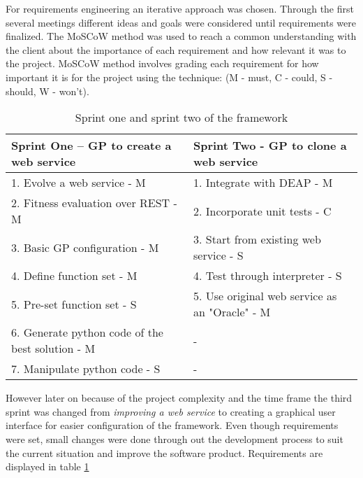 For requirements engineering an iterative approach was chosen. Through the first several meetings
different ideas and goals were considered until requirements were finalized. The MoSCoW\cite{moscow} method was used to
reach a common understanding with the client about the importance of each requirement and how
relevant it was to the project. MoSCoW method involves grading each requirement for how important it is for the project using the technique:
(M - must, C - could, S - should, W - won't).

\begin{table}[ht] 
\caption{Sprint one and sprint two of the framework} %
\centering %
\begin{tabular}{l l} %
\hline\hline %
Sprint One – GP to create a web service & Sprint Two - GP to clone a web service \\ [0.5ex] %
\hline %
1. Evolve a web service - M & 1. Integrate with DEAP - M \\
2. Fitness evaluation over REST - M & 2. Incorporate unit tests - C \\
3. Basic GP configuration - M & 3. Start from existing web service - S \\
4. Define function set - M & 4. Test through interpreter - S \\
5. Pre-set function set - S & 5. Use original web service as an "Oracle" - M \\
6. Generate python code of the best solution - M & - \\
7. Manipulate python code - S & - \\ [1ex]
\hline %
\end{tabular} 
\label{table:req} %
\end{table}

However later on because of the project complexity and the time frame the third sprint was changed
from \textit{improving a web service} to creating a graphical user interface for easier configuration of the 
framework.  Even though requirements were set, small changes were done through out the development process
to suit the current situation and improve the software product. Requirements are displayed in table \ref{table:req}

